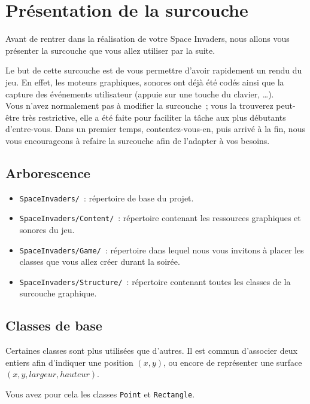 \chapter{Présentation de la surcouche}

Avant de rentrer dans la réalisation de votre Space Invaders, nous allons vous présenter la surcouche que vous allez utiliser par la suite.

Le but de cette surcouche est de vous permettre d'avoir rapidement un rendu du jeu. En effet, les moteurs graphiques, sonores ont déjà été codés ainsi que la capture des événements utilisateur (appuie sur une touche du clavier, \ldots).\\

Vous n'avez normalement pas à modifier la surcouche~; vous la trouverez peut-être très restrictive, elle a été faite pour faciliter la tâche aux plus débutants d'entre-vous. Dans un premier temps, contentez-vous-en, puis arrivé à la fin, nous vous encourageons à refaire la surcouche afin de l'adapter à vos besoins.

\section{Arborescence}

\begin{itemize}
  \item \texttt{SpaceInvaders/}~: répertoire de base du projet.
  \item \texttt{SpaceInvaders/Content/}~: répertoire contenant les ressources graphiques et sonores du jeu.
  \item \texttt{SpaceInvaders/Game/}~: répertoire dans lequel nous vous invitons à placer les classes que vous allez créer durant la soirée.
  \item \texttt{SpaceInvaders/Structure/}~: répertoire contenant toutes les classes de la surcouche graphique.
\end{itemize}


\section{Classes de base}

Certaines classes sont plus utilisées que d'autres. Il est commun d'associer deux entiers afin d'indiquer une position $(x, y)$, ou encore de représenter une surface $(x, y, largeur, hauteur)$.

Vous avez pour cela les classes \texttt{Point} et \texttt{Rectangle}.

